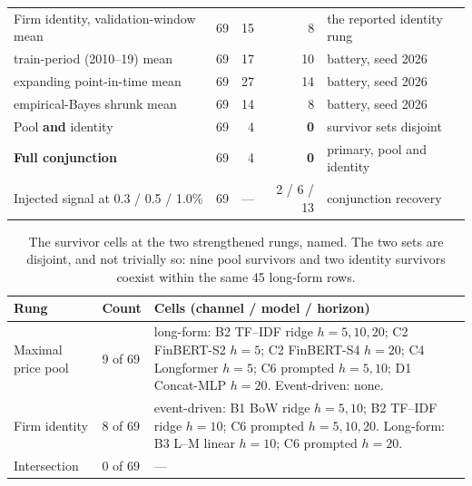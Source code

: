\begin{table}[htbp]
\begin{tabular}{@{}llrrl@{}}
\midrule
Firm identity, validation-window mean & 69 & 15 & 8 & the reported identity rung \\ %
\quad train-period (2010--19) mean    & 69 & 17 & 10 & battery, seed 2026 \\ %
\quad expanding point-in-time mean    & 69 & 27 & 14 & battery, seed 2026 \\ %
\quad empirical-Bayes shrunk mean     & 69 & 14 & 8  & battery, seed 2026 \\ %
\midrule
Pool \textbf{and} identity            & 69 & 4 & \textbf{0} & survivor sets disjoint \\ %
\textbf{Full conjunction}             & 69 & 4 & \textbf{0} & primary, pool and identity \\ %
\midrule
Injected signal at 0.3 / 0.5 / 1.0\%  & 69 & --- & 2 / 6 / 13 & conjunction recovery \\ %
\bottomrule
\end{tabular}
\end{table}

\begin{table}[htbp]
\centering
\caption[Named survivor cells at the two strengthened rungs]{The
survivor cells at the two strengthened rungs, named. The two sets are
disjoint, and not trivially so: nine pool survivors and two identity
survivors coexist within the same 45 long-form rows.}
\label{tab:app-survivors}
\singlespacing\small
\begin{tabular}{@{}llp{}@{}}
\toprule
Rung & Count & Cells (channel / model / horizon) \\
\midrule
Maximal price pool & 9 of 69 &
long-form: B2 TF--IDF ridge $h{=}5,10,20$; C2 FinBERT-S2 $h{=}5$;
C2 FinBERT-S4 $h{=}20$; C4 Longformer $h{=}5$; C6 prompted
$h{=}5,10$; D1 Concat-MLP $h{=}20$. Event-driven: none. \\
\addlinespace
Firm identity & 8 of 69 &
event-driven: B1 BoW ridge $h{=}5,10$; B2 TF--IDF ridge $h{=}10$;
C6 prompted $h{=}5,10,20$. Long-form: B3 L--M linear $h{=}10$;
C6 prompted $h{=}20$. \\
\addlinespace
Intersection & 0 of 69 & --- \\
\bottomrule
\end{tabular}
\end{table}

